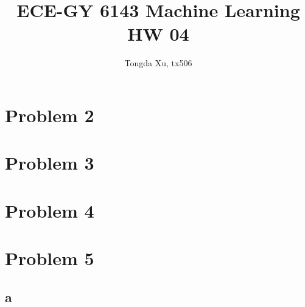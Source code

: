 \documentclass[]{article}
\title{ECE-GY 6143 Machine Learning HW 04}
\author{Tongda Xu, tx506}
\begin{document}
\maketitle
\section{Problem 2}

\section{Problem 3}

\section{Problem 4}

\section{Problem 5}
\subsection{a}
\begin{lstlisting}

\end{lstlisting}
\end{document}
